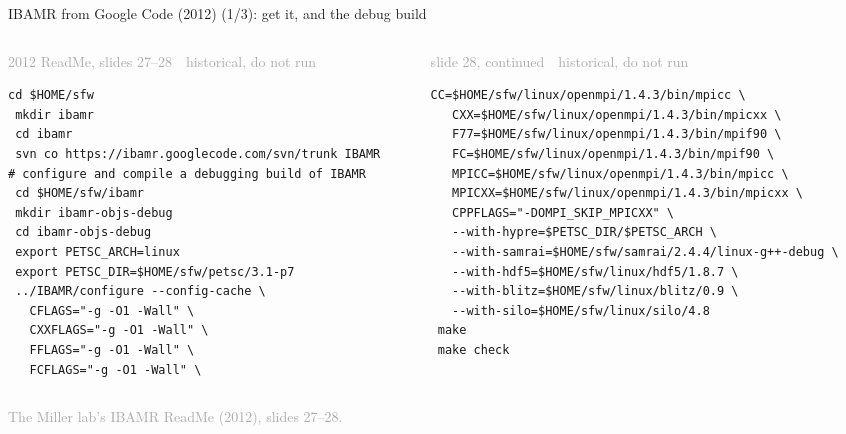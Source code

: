 \documentclass[aspectratio=169,11pt]{beamer}
\newcommand{\sourcecredit}[1]{\vfill\begin{flushright}\tiny\textcolor{DarkGray}{#1}\end{flushright}}
\newcommand{\hist}[1]{{\tiny\sffamily\textcolor{DarkGray}{#1\ \textbullet\ historical, do not run}}\par\nointerlineskip\vspace{0.3mm}}
\begin{document}
\begin{frame}[fragile]{IBAMR from Google Code (2012) (1/3): get it, and the debug build}
\label{fr:ibamr2012}
\begin{columns}[T,onlytextwidth]
\begin{column}{0.48\textwidth}
\hist{2012 ReadMe, slides 27--28}
\begin{lstlisting}[style=hist]
cd $HOME/sfw
 mkdir ibamr
 cd ibamr
 svn co https://ibamr.googlecode.com/svn/trunk IBAMR
# configure and compile a debugging build of IBAMR
 cd $HOME/sfw/ibamr
 mkdir ibamr-objs-debug
 cd ibamr-objs-debug
 export PETSC_ARCH=linux
 export PETSC_DIR=$HOME/sfw/petsc/3.1-p7
 ../IBAMR/configure --config-cache \
   CFLAGS="-g -O1 -Wall" \
   CXXFLAGS="-g -O1 -Wall" \
   FFLAGS="-g -O1 -Wall" \
   FCFLAGS="-g -O1 -Wall" \
\end{lstlisting}
\end{column}
\begin{column}{0.49\textwidth}
\hist{slide 28, continued}
\begin{lstlisting}[style=hist]
   CC=$HOME/sfw/linux/openmpi/1.4.3/bin/mpicc \
   CXX=$HOME/sfw/linux/openmpi/1.4.3/bin/mpicxx \
   F77=$HOME/sfw/linux/openmpi/1.4.3/bin/mpif90 \
   FC=$HOME/sfw/linux/openmpi/1.4.3/bin/mpif90 \
   MPICC=$HOME/sfw/linux/openmpi/1.4.3/bin/mpicc \
   MPICXX=$HOME/sfw/linux/openmpi/1.4.3/bin/mpicxx \
   CPPFLAGS="-DOMPI_SKIP_MPICXX" \
   --with-hypre=$PETSC_DIR/$PETSC_ARCH \
   --with-samrai=$HOME/sfw/samrai/2.4.4/linux-g++-debug \
   --with-hdf5=$HOME/sfw/linux/hdf5/1.8.7 \
   --with-blitz=$HOME/sfw/linux/blitz/0.9 \
   --with-silo=$HOME/sfw/linux/silo/4.8
 make
 make check
\end{lstlisting}
\end{column}
\end{columns}
\sourcecredit{The Miller lab's IBAMR ReadMe (2012), slides 27--28.}
\end{frame}
\end{document}
